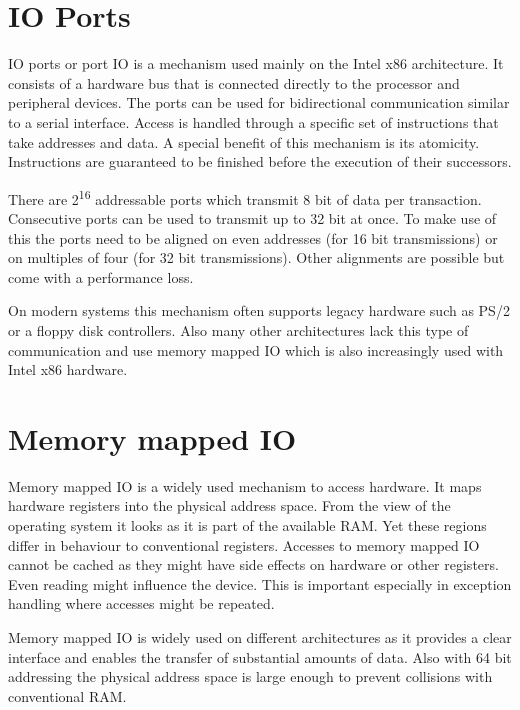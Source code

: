 \documentclass[
a4paper,
12pt,
notitlepage,
parskip=half,
DIV=11,
]{scrbook}
\begin{document}
	\section{IO Ports}
	
	IO ports or port IO is a mechanism used mainly on the Intel x86 architecture.
	It consists of a hardware bus that is connected directly to the processor and peripheral devices.
	The ports can be used for bidirectional communication similar to a serial interface.
	Access is handled through a specific set of instructions that take addresses and data.
	A special benefit of this mechanism is its atomicity.
	Instructions are guaranteed to be finished before the execution of their successors.
	
	There are 2\textsuperscript{16} addressable ports which transmit 8 bit of data per transaction.
	Consecutive ports can be used to transmit up to 32 bit at once.
	To make use of this the ports need to be aligned on even addresses (for 16 bit transmissions) or on multiples of four (for 32 bit transmissions).
	Other alignments are possible but come with a performance loss.
	
	On modern systems this mechanism often supports legacy hardware such as PS/2 or a floppy disk controllers.
	Also many other architectures lack this type of communication and use memory mapped IO which is also increasingly used with Intel x86 hardware.
	\citep{ioports} \citep{intelmanual}
	
	\section{Memory mapped IO}
	
	Memory mapped IO is a widely used mechanism to access hardware.
	It maps hardware registers into the physical address space.
	From the view of the operating system it looks as it is part of the available RAM.
	Yet these regions differ in behaviour to conventional registers.
	Accesses to memory mapped IO cannot be cached as they might have side effects on hardware or other registers.
	Even reading might influence the device.
	This is important especially in exception handling where accesses might be repeated.
	
	Memory mapped IO is widely used on different architectures as it provides a clear interface and enables the transfer of substantial amounts of data.
	Also with 64 bit addressing the physical address space is large enough to prevent collisions with conventional RAM.
	\citep{intelmanual}
	
\end{document}
